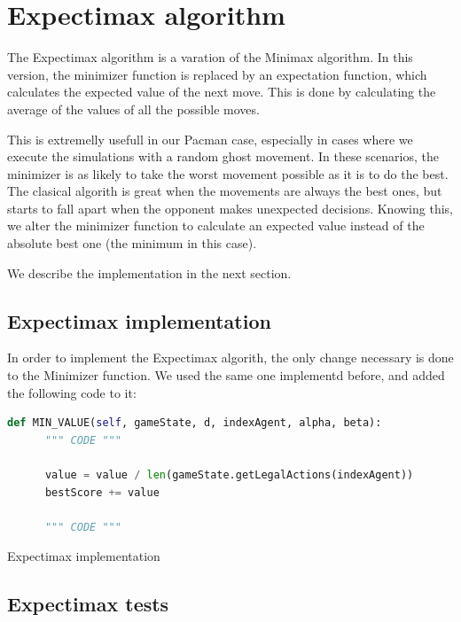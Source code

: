 \documentclass{article}
\begin{document}
\pagebreak
\section{Expectimax algorithm}

The Expectimax algorithm is a varation of the Minimax algorithm. In this version, the minimizer function is replaced by an expectation function, which calculates the expected value of the next move. This is done by calculating the average of the values of all the possible moves.

This is extremelly usefull in our Pacman case, especially in cases where we execute the simulations with a random ghost movement. In these scenarios, the minimizer is as likely to take the worst movement possible as it is to do the best. The clasical algorith is great when the movements are always the best ones, but starts to fall apart when the opponent makes unexpected decisions. Knowing this, we alter the minimizer function to calculate an expected value instead of the absolute best one (the minimum in this case).

We describe the implementation in the next section.

\subsection{Expectimax implementation}
\label{sec:expectimax}

In order to implement the Expectimax algorith, the only change necessary is done to the Minimizer function. We used the same one implementd before, and added the following code to it:

\begin{table}[!ht]
  \begin{lstlisting}[language=python, frame=tlbr, framesep=6pt, backgroundcolor=\color{light-gray}]
    def MIN_VALUE(self, gameState, d, indexAgent, alpha, beta):
      """ CODE """

      value = value / len(gameState.getLegalActions(indexAgent))
      bestScore += value

      """ CODE """
  \end{lstlisting}
  \caption{Expectimax implementation}
\end{table}

\subsection{Expectimax tests}
\end{document}
